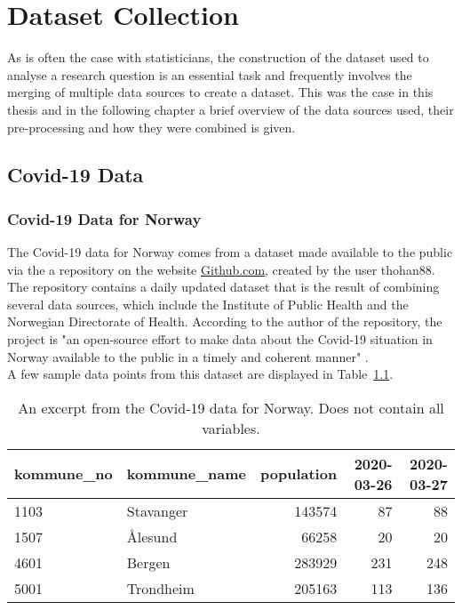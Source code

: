 %
\chapter{Dataset Collection}
As is often the case with statisticians, the construction of the dataset used to analyse a research question is an essential task and frequently involves the merging of multiple data sources to create a dataset. This was the case in this thesis and in the following chapter a brief overview of the data sources used, their pre-processing and how they were combined is given.
\label{sec:datacollection}
\clearpage
\section{Covid-19 Data}
\subsection{Covid-19 Data for Norway}
The Covid-19 data for Norway comes from a dataset made available to the public via the a repository on the website \href{https://www.github.com}{Github.com}, created by the user thohan88. The repository contains a daily updated dataset that is the result of combining several data sources, which include the Institute of Public Health and the Norwegian Directorate of Health. According to the author of the repository, the project is "an open-source effort to make data about the Covid-19 situation in Norway available to the public in a timely and coherent manner" \cite{thohan88}. \\
A few sample data points from this dataset are displayed in Table~\ref{datasetNorge}.\\
\begin{table}[H] 
\caption{An excerpt from the Covid-19 data for Norway. Does not contain all variables.\label{datasetNorge}}
\begin{tabular}{l l r r r}
\toprule
\textbf{kommune\_no}	& \textbf{kommune\_name}	& \textbf{population}	& \textbf{2020-03-26}	& \textbf{2020-03-27}\\
\midrule
1103 & Stavanger & 143574 & 87 & 88 \\
1507 & Ålesund & 66258 & 20 & 20 \\
4601 & Bergen & 283929 & 231 & 248 \\
5001 & Trondheim & 205163 & 113 & 136 \\
\bottomrule
\end{tabular}
\end{table}
